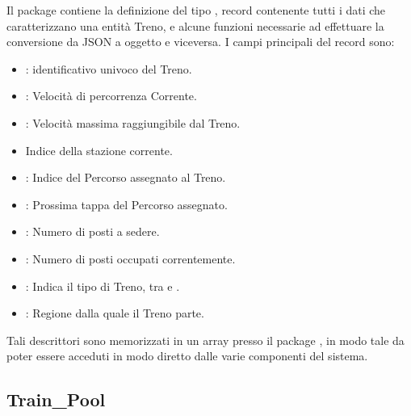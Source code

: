 	Il package  contiene la definizione del tipo , record contenente tutti i dati che caratterizzano una entità Treno, e alcune funzioni necessarie ad effettuare la conversione da JSON a oggetto  e viceversa.
	I campi principali del record  sono:
	\begin{itemize}
		\item {}: identificativo univoco del Treno.
		\item {}: Velocità di percorrenza Corrente.
	    \item {}: Velocità massima raggiungibile dal Treno.
	    \item {} Indice della stazione corrente.
	    \item {}: Indice del Percorso assegnato al Treno.
	    \item {}: Prossima tappa del Percorso assegnato.
	    \item {}: Numero di posti a sedere.
	    \item {}: Numero di posti occupati correntemente.
		\item {}: Indica il tipo di Treno, tra  e .
		\item {}: Regione dalla quale il Treno parte.
	\end{itemize}
	
	Tali descrittori sono memorizzati in un array  presso il package , in modo tale da poter essere acceduti in modo diretto dalle varie componenti del sistema.
	
	\subsection{Train\_Pool}
	
